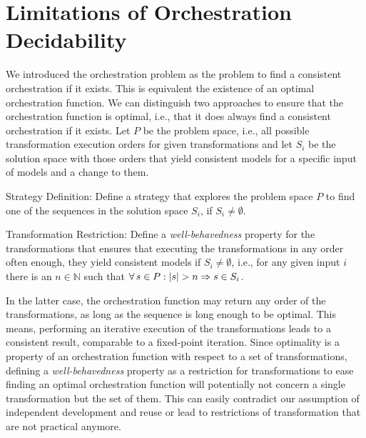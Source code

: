 \section{Limitations of Orchestration Decidability}

We introduced the orchestration problem as the problem to find a consistent orchestration if it exists.
This is equivalent the existence of an optimal orchestration function.
We can distinguish two approaches to ensure that the orchestration function is optimal, i.e., that it does always find a consistent orchestration if it exists.
Let $P$ be the problem space, i.e., all possible transformation execution orders for given transformations and let $S_{i}$ be the solution space with those orders that yield consistent models for a specific input of models and a change to them.
\begin{properdescription}
    \item[Strategy Definition:] Define a strategy that explores the problem space $P$ to find one of the sequences in the solution space $S_{i}$, if $S_{i} \neq \emptyset$.
    \item[Transformation Restriction:] Define a \emph{well-behavedness} property for the transformations that ensures that executing the transformations in any order often enough, they yield consistent models if $S_{i} \neq \emptyset$, i.e., for any given input $i$ there is an $n \in \mathbb{N}$ such that $\forall s \in P : \abs{s} > n \Rightarrow s \in S_{i}$.
\end{properdescription}


In the latter case, the orchestration function may return any order of the transformations, as long as the sequence is long enough to be optimal.
This means, performing an iterative execution of the transformations leads to a consistent result, comparable to a fixed-point iteration.
Since optimality is a property of an orchestration function with respect to a set of transformations, defining a \emph{well-behavedness} property as a restriction for transformations to ease finding an optimal orchestration function will potentially not concern a single transformation but the set of them.
This can easily contradict our assumption of independent development and reuse or lead to restrictions of transformation that are not practical anymore.

